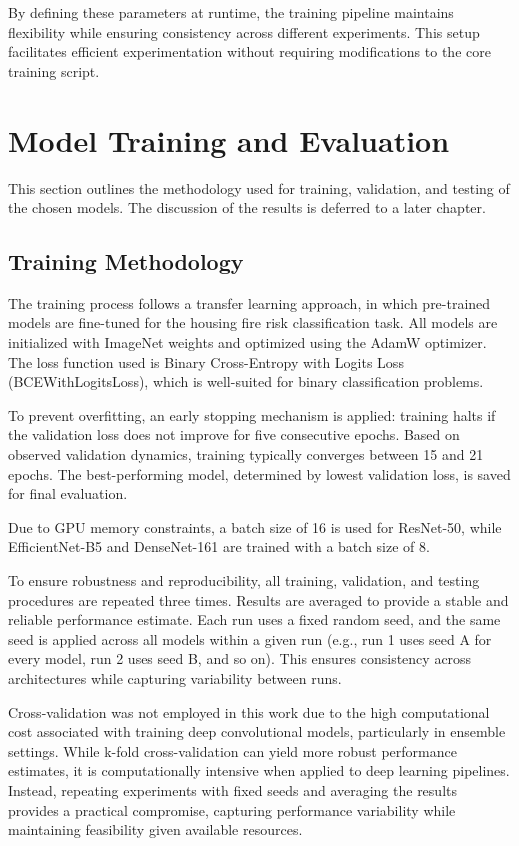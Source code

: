 By defining these parameters at runtime, the training pipeline maintains flexibility while 
ensuring consistency across different experiments. This setup facilitates efficient 
experimentation without requiring modifications to the core training script.


\section{Model Training and Evaluation}


This section outlines the methodology used for training, validation, and testing of the 
chosen models. The discussion of the results is deferred to a later chapter.

\subsection{Training Methodology}

The training process follows a transfer learning approach, in which pre-trained 
models are fine-tuned for the housing fire risk classification task. All models 
are initialized with ImageNet weights and optimized using the AdamW optimizer. 
The loss function used is Binary Cross-Entropy with Logits Loss (BCEWithLogitsLoss), 
which is well-suited for binary classification problems.

To prevent overfitting, an early stopping mechanism is applied: training halts 
if the validation loss does not improve for five consecutive epochs. Based on 
observed validation dynamics, training typically converges between 15 and 21 
epochs. The best-performing model, determined by lowest validation loss, is saved 
for final evaluation.

Due to GPU memory constraints, a batch size of 16 is used for ResNet-50, while 
EfficientNet-B5 and DenseNet-161 are trained with a batch size of 8.

To ensure robustness and reproducibility, all training, validation, and testing 
procedures are repeated three times. Results are averaged to provide a stable
and reliable performance estimate. Each run uses a fixed random seed, and the 
same seed is applied across all models within a given run (e.g., run 1 uses 
seed A for every model, run 2 uses seed B, and so on). This ensures consistency 
across architectures while capturing variability between runs.

Cross-validation was not employed in this work due to the high computational 
cost associated with training deep convolutional models, particularly in ensemble 
settings. While k-fold cross-validation can yield more robust performance estimates, 
it is computationally intensive when applied to deep learning pipelines. Instead, 
repeating experiments with fixed seeds and averaging the results provides a 
practical compromise, capturing performance variability while maintaining feasibility 
given available resources.


